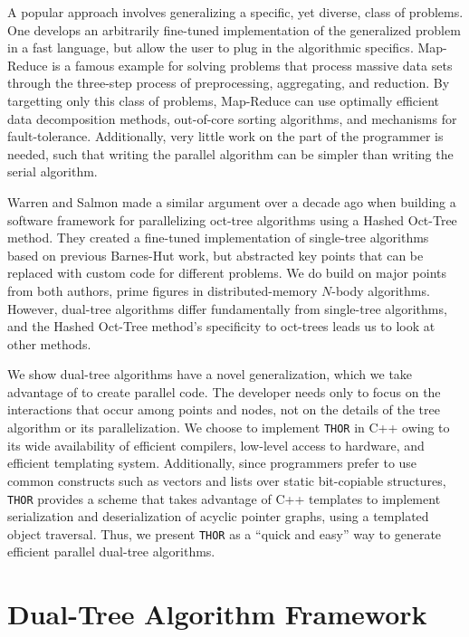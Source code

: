 \documentclass[twoside,leqno,twocolumn]{article}
\newcommand{\THOR}{{{\tt THOR}} }
\begin{document}
A popular approach involves generalizing a specific, yet diverse, class of problems.
One develops an arbitrarily fine-tuned implementation of the generalized problem in a fast language, but allow the user to plug in the algorithmic specifics.
Map-Reduce\cite{mapreduce} is a famous example for solving problems that process massive data sets through the three-step process of preprocessing, aggregating, and reduction.
By targetting only this class of problems, Map-Reduce can use optimally efficient data decomposition methods, out-of-core sorting algorithms, and mechanisms for fault-tolerance.
Additionally, very little work on the part of the programmer is needed, such that writing the parallel algorithm can be simpler than writing the serial algorithm.

Warren and Salmon\cite{warren95portable} made a similar argument over a decade ago when building a software framework for parallelizing oct-tree algorithms using a Hashed Oct-Tree method.
They created a fine-tuned implementation of single-tree algorithms based on previous Barnes-Hut work, but abstracted key points that can be replaced with custom code for different problems.
We do build on major points from both authors, prime figures in distributed-memory $N$-body algorithms.
However, dual-tree algorithms differ fundamentally from single-tree algorithms, and the Hashed Oct-Tree method's specificity to oct-trees leads us to look at other methods.

We show dual-tree algorithms have a novel generalization, which we take advantage of to create parallel code.
The developer needs only to focus on the interactions that occur among points and nodes, not on the details of the tree algorithm or its parallelization.
We choose to implement \THOR in C++ owing to its wide availability of efficient compilers, low-level access to hardware, and efficient templating system.
Additionally, since programmers prefer to use common constructs such as vectors and lists over static bit-copiable structures, \THOR provides a scheme that takes advantage of C++ templates to implement serialization and deserialization of acyclic pointer graphs, using a templated object traversal.
Thus, we present \THOR as a ``quick and easy'' way to generate efficient parallel dual-tree algorithms.

\section{Dual-Tree Algorithm Framework}
\end{document}
